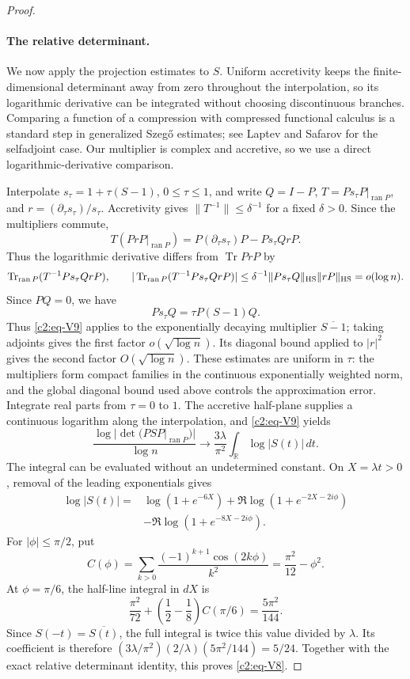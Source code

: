 \begin{proof}
\paragraph{The relative determinant.}
We now apply the projection estimates to \(S\). Uniform accretivity keeps
the finite-dimensional determinant away from zero throughout the
interpolation, so its logarithmic derivative can be integrated without
choosing discontinuous branches.
Comparing a function of a compression with compressed functional
calculus is a standard step in generalized Szeg\H{o} estimates; see
Laptev and Safarov \cite[Corollary~7, (5)]{LaptevSafarov1991} for the
selfadjoint case. Our multiplier is complex and accretive, so we use a
direct logarithmic-derivative comparison.

Interpolate \(s_\tau=1+\tau(S-1)\), \(0\le\tau\le1\), and write
\(Q=I-P\), \(T=Ps_\tau P|_{\operatorname{ran}P}\), and
\(r=(\partial_\tau s_\tau)/s_\tau\). Accretivity gives
\(\|T^{-1}\|\le\delta^{-1}\) for a fixed \(\delta>0\). Since the
multipliers commute,
\[
 T(PrP|_{\operatorname{ran}P})=P(\partial_\tau s_\tau)P-Ps_\tau QrP.
\]
Thus the logarithmic derivative differs from \(\operatorname{Tr}PrP\) by
\[
 \operatorname{Tr}_{\operatorname{ran}P}(T^{-1}Ps_\tau QrP),
 \qquad
 |\operatorname{Tr}_{\operatorname{ran}P}(T^{-1}Ps_\tau QrP)|
 \le \delta^{-1}\|Ps_\tau Q\|_{\rm HS}\|rP\|_{\rm HS}
 =o(\log n).
\]
Since \(PQ=0\), we have
\[
 Ps_\tau Q=\tau P(S-1)Q.
\]
Thus \eqref{c2:eq-V9} applies to the exponentially decaying multiplier
\(\overline{S-1}\); taking adjoints gives the first factor
\(o(\sqrt{\log n})\). Its diagonal bound applied to \(|r|^2\)
gives the second factor
\(O(\sqrt{\log n})\). These estimates are uniform in \(\tau\): the
multipliers form compact families in the continuous exponentially
weighted norm, and the global diagonal bound used above controls the
approximation error. Integrate real parts from \(\tau=0\) to \(1\). The accretive
half-plane supplies a continuous logarithm along the interpolation, and
\eqref{c2:eq-V9} yields
\[
 \frac{\log|\det(PSP|_{\operatorname{ran}P})|}{\log n}
 \longrightarrow\frac{3\lambda}{\pi^2}
                   \int_{\mathbb R}\log|S(t)|\,dt.
\]
The integral can be evaluated without an undetermined constant. On
\(X=\lambda t>0\), removal of the leading exponentials gives
\[
\begin{split}
 \log|S(t)|={}&\log(1+e^{-6X})
 +\Re\log(1+e^{-2X-2i\phi})\\
 &-\Re\log(1+e^{-8X-2i\phi}).
\end{split}
\]
For \(|\phi|\le\pi/2\), put
\[
 C(\phi)=\sum_{k>0}\frac{(-1)^{k+1}\cos(2k\phi)}{k^2}
        =\frac{\pi^2}{12}-\phi^2.
\]
At \(\phi=\pi/6\), the half-line integral in \(dX\) is
\[
 \frac{\pi^2}{72}+\left(\frac12-\frac18\right)C(\pi/6)
 =\frac{5\pi^2}{144}.
\]
Since \(S(-t)=\overline{S(t)}\), the full integral is twice this value
divided by \(\lambda\). Its coefficient is therefore
\((3\lambda/\pi^2)(2/\lambda)(5\pi^2/144)=5/24\).
Together with the exact relative determinant identity, this proves
\eqref{c2:eq-V8}.
\end{proof}

